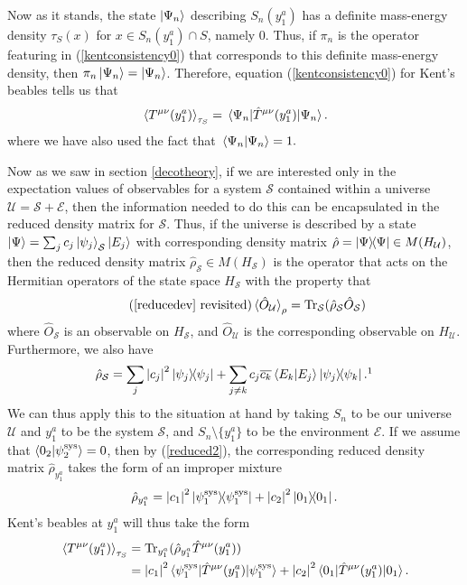 Now as it stands, the state $\ket{\Psi_n}$ describing $S_n(y^a_1)$ has a definite mass-energy density $\tau_S(x)$ for $x\in S_n(y^a_1)\cap S$, namely $0$. Thus, if $\pi_n$ is the operator featuring in (\ref{kentconsistency0}) that corresponds to this definite mass-energy density, then $\pi_n\ket{\Psi_n}=\ket{\Psi_n}$. Therefore, equation (\ref{kentconsistency0}) for Kent's beables tells us that
$$\ev*{T^{\mu\nu}(y^a_1)}_{\tau_S}=\ev*{\hat{T}^{\mu\nu}(y^a_1)}{\Psi_n}.$$ 
where we have also used the fact that $\ip*{\Psi_n}{\Psi_n}=1.$

Now as we saw in section \ref{decotheory}, if we are interested only in the expectation values of observables for a system $\mathcal{S}$ contained within a universe $\mathcal{U}=\mathcal{S}+\mathcal{E}$, then the information needed to do this can be encapsulated in the reduced density matrix for $\mathcal{S}$. Thus, if the universe is described by a state 
$\ket{\Psi}=\sum_j c_j \ket{\psi_j}_\mathcal{S}\ket{E_j}$ with corresponding density matrix $\hat{\rho}=\dyad{\Psi}\in M(H_\mathcal{U})$, then the reduced density matrix $\hat{\rho}_\mathcal{S}\in M(H_\mathcal{S})$ is the operator that acts on the Hermitian operators of the state space $H_\mathcal{S}$ with the property that 
\begin{equation}\tag{\ref{reducedev} revisited}
\ev*{\hat{O}_\mathcal{U}}_\rho=\Tr_\mathcal{S}(\hat{\rho}_\mathcal{S}\hat{O}_\mathcal{S})
\end{equation}
where $\hat{O}_\mathcal{S}$ is an observable on $H_\mathcal{S}$,  and $\hat{O}_\mathcal{U}$ is the corresponding observable on $H_\mathcal{U}$. Furthermore, we also have
\begin{equation}\label{reduced2}
\hat{\rho}_\mathcal{S}=\sum_j \abs{c_j}^2\dyad{\psi_j}+\sum_{j\neq k} c_j\overline{c_k}\ip{E_k}{E_j}\dyad{\psi_j}{\psi_k}.\protect\footnotemark
\end{equation}
We can thus apply this to the situation at hand by taking $S_n$ to be our universe $\mathcal{U}$ and $y^a_1$ to be the system $\mathcal{S}$, and $S_n\setminus \{y^a_1\}$ to be the environment $\mathcal{E}$. If we assume that $\ip{0_2}{\psi_2^\text{sys}}= 0$, then by (\ref{reduced2}), the corresponding reduced density matrix $\hat{\rho}_{y^a_1}$ takes the form of an improper mixture
\begin{equation}\label{kentred}
\hat{\rho}_{y^a_1}= \abs{c_1}^2\dyad{\psi_1^\text{sys}}+\abs{c_2}^2\dyad{0_1}.
\end{equation}
Kent's beables at $y^a_1$ will thus take the form 
\begin{equation}\label{kentbe}
\begin{split}
\ev*{T^{\mu\nu}(y^a_1)}_{\tau_S}&=\Tr_{y^a_1}(\hat{\rho}_{y^a_1}\hat{T}^{\mu\nu}(y^a_1))\\
&=\abs{c_1}^2\ev*{\hat{T}^{\mu\nu}(y^a_1)}{\psi_1^\text{sys}}+\abs{c_2}^2\ev*{\hat{T}^{\mu\nu}(y^a_1)}{0_1}.
\end{split}
\end{equation}

